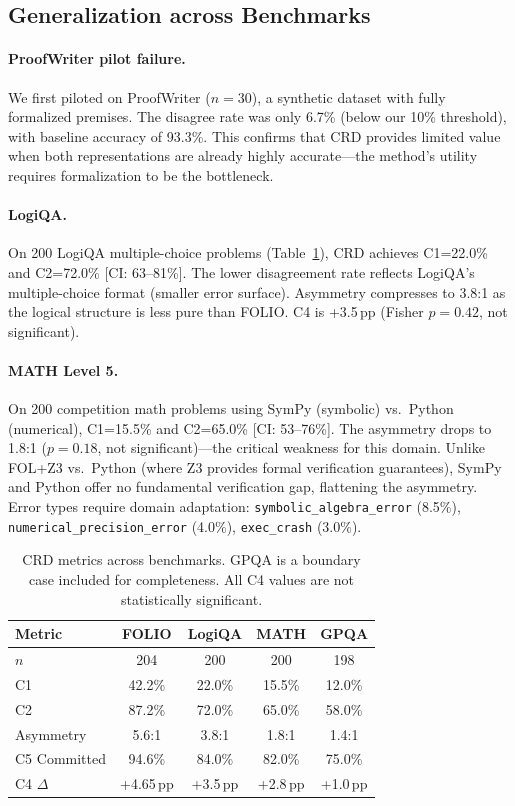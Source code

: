 \documentclass[11pt,a4paper]{article}
\newcommand{\method}{CRD}
\newcommand{\pp}{\,pp}
\begin{document}
\subsection{Generalization across Benchmarks}
\label{sec:generalization}

\paragraph{ProofWriter pilot failure.}
We first piloted on ProofWriter ($n{=}30$), a synthetic dataset with fully formalized premises.
The disagree rate was only 6.7\% (below our 10\% threshold), with baseline accuracy of 93.3\%.
This confirms that \method{} provides limited value when both representations are already highly accurate---the method's utility requires formalization to be the bottleneck.

\paragraph{LogiQA.}
On 200 LogiQA multiple-choice problems (Table~\ref{tab:generalization}), \method{} achieves C1=22.0\% and C2=72.0\% [CI: 63--81\%].
The lower disagreement rate reflects LogiQA's multiple-choice format (smaller error surface).
Asymmetry compresses to 3.8:1 as the logical structure is less pure than FOLIO.
C4 is +3.5\pp{} (Fisher $p{=}0.42$, not significant).

\paragraph{MATH Level 5.}
On 200 competition math problems using SymPy (symbolic) vs.\ Python (numerical), C1=15.5\% and C2=65.0\% [CI: 53--76\%].
The asymmetry drops to 1.8:1 ($p{=}0.18$, not significant)---the critical weakness for this domain.
Unlike FOL+Z3 vs.\ Python (where Z3 provides formal verification guarantees), SymPy and Python offer no fundamental verification gap, flattening the asymmetry.
Error types require domain adaptation: \texttt{symbolic\_algebra\_error} (8.5\%), \texttt{numerical\_precision\_error} (4.0\%), \texttt{exec\_crash} (3.0\%).

\begin{table}[t]
\centering
\small
\begin{tabular}{lcccc}
\toprule
\textbf{Metric} & \textbf{FOLIO} & \textbf{LogiQA} & \textbf{MATH} & \textbf{GPQA} \\
\midrule
$n$ & 204 & 200 & 200 & 198 \\
C1 & 42.2\% & 22.0\% & 15.5\% & 12.0\% \\
C2 & 87.2\% & 72.0\% & 65.0\% & 58.0\% \\
Asymmetry & 5.6:1 & 3.8:1 & 1.8:1 & 1.4:1 \\
C5 Committed & 94.6\% & 84.0\% & 82.0\% & 75.0\% \\
C4 $\Delta$ & +4.65\pp{} & +3.5\pp{} & +2.8\pp{} & +1.0\pp{} \\
\bottomrule
\end{tabular}
\caption{CRD metrics across benchmarks. GPQA is a boundary case included for completeness. All C4 values are not statistically significant.}
\label{tab:generalization}
\end{table}
\end{document}
